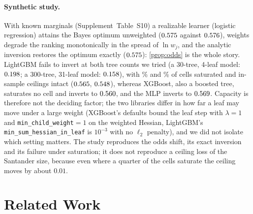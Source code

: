\documentclass[sigconf,nonacm]{acmart}
\newcommand{\Supp}[1]{Supplement~#1}  %
\begin{document}
\paragraph{Synthetic study.} With known marginals (\Supp{Table~S10}) a realizable learner (logistic regression) attains the Bayes optimum unweighted ($0.575$ against $0.576$), weights degrade the ranking monotonically in the spread of $\ln w_j$, and the analytic inversion restores the optimum exactly ($0.575$): \cref{prop:odds} is the whole story. LightGBM fails to invert at both tree counts we tried (a 30-tree, 4-leaf model: $0.198$; a 300-tree, 31-leaf model: $0.158$), with \nsynSmallSatD\% and \nsynLargeSatD\% of cells saturated and in-sample ceilings intact ($0.565$, $0.548$), whereas XGBoost, also a boosted tree, saturates no cell and inverts to $0.560$, and the MLP inverts to $0.569$. Capacity is therefore not the deciding factor; the two libraries differ in how far a leaf may move under a large weight (XGBoost's defaults bound the leaf step with $\lambda=1$ and \texttt{min\_child\_weight}$=1$ on the weighted Hessian, LightGBM's \texttt{min\_sum\_hessian\_in\_leaf} is $10^{-3}$ with no $\ell_2$ penalty), and we did not isolate which setting matters. The study reproduces the odds shift, its exact inversion and its failure under saturation; it does not reproduce a ceiling loss of the Santander size, because even where a quarter of the cells saturate the ceiling moves by about $0.01$.

\section{Related Work}
\label{sec:related}
\end{document}
